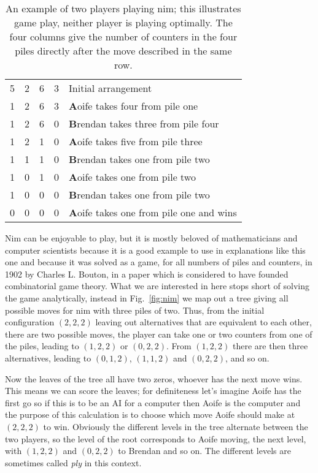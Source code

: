\documentclass[11pt,a4paper]{scrartcl}
\begin{document}
{\begin{table}
\begin{tabular}{cccc|l}
5&2&6&3&Initial arrangement\\
1&2&6&3&\textbf{A}oife takes four from pile one\\
1&2&6&0&\textbf{B}rendan takes three from pile four\\
1&2&1&0&\textbf{A}oife takes five from pile three\\
1&1&1&0&\textbf{B}rendan takes one from pile two\\
1&0&1&0&\textbf{A}oife takes one from pile two\\
1&0&0&0&\textbf{B}rendan takes one from pile two\\
0&0&0&0&\textbf{A}oife takes one from pile one and wins
\end{tabular}
\caption{An example of two players playing nim; this illustrates game play, neither player is playing optimally. The four columns give the number of counters in the four piles directly after the move described in the same row.\label{tab:nim_example}}
\end{table}

Nim can be enjoyable to play, but it is mostly beloved of
mathematicians and computer scientists because it is a good example to
use in explanations like this one and because it was solved as a game,
for all numbers of piles and counters, in 1902 by Charles L. Bouton,
in a paper which is considered to have founded combinatorial game
theory. What we are interested in here stops short of solving the game
analytically, instead in Fig.~\ref{fig:nim} we map out a tree giving
all possible moves for nim with three piles of two. Thus, from the
initial configuration $(2,2,2)$ leaving out alternatives that are
equivalent to each other, there are two possible moves, the player can
take one or two counters from one of the piles, leading to $(1,2,2)$
or $(0,2,2)$. From $(1,2,2)$ there are then three alternatives,
leading to $(0,1,2)$, $(1,1,2)$ and $(0,2,2)$, and so on.

Now the leaves of the tree all have two zeros, whoever has the next
move wins. This means we can score the leaves; for definiteness let's
imagine Aoife has the first go so if this is to be an AI for a
computer then Aoife is the computer and the purpose of this
calculation is to choose which move Aoife should make at $(2,2,2)$ to
win. Obviously the different levels in the tree alternate between the
two players, so the level of the root corresponds to Aoife moving, the
next level, with $(1,2,2)$ and $(0,2,2)$ to Brendan and so on. The
different levels are sometimes called \textsl{ply} in this context.

}
\end{document}
